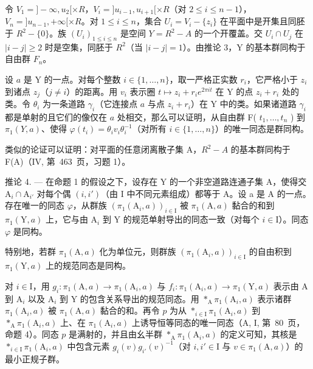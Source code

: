 令 \(V_{1} = ]-\infty, u_{2}[ \times R\)，\(V_{i} = ]u_{i-1}, u_{i+1}[ \times R\)（对 \(2 \leqslant i \leqslant n-1\)），\(V_{n} = ]u_{n-1}, +\infty[ \times R\)。对 \(1 \leqslant i \leqslant n\)，集合 \(U_{i} = V_{i} - \{z_{i}\}\) 在平面中是开集且同胚于 \(R^{2} - \{0\}\)。族 \((U_{i})_{1 \leqslant i \leqslant n}\) 是空间 \(Y = R^{2} - A\) 的一个开覆盖。交 \(U_{i} \cap U_{j}\) 在 \(|i - j| \geqslant 2\) 时是空集，同胚于 \(R^{2}\)（当 \(|i - j| = 1\)）。由推论 3，Y 的基本群同构于自由群 \(F_{n}\)。

设 \(a\) 是 Y 的一点。对每个整数 \(i \in \{1, \ldots, n\}\)，取一严格正实数 \(r_i\)，它严格小于 \(z_i\) 到诸点 \(z_j\)（\(j \neq i\)）的距离。用 \(v_i\) 表示圈 \(t \mapsto z_i + r_i e^{2\pi it}\) 在 Y 的点 \(z_i + r_i\) 处的类。令 \(\theta_i\) 为一条道路 \(\gamma_i\)（它连接点 \(a\) 与点 \(z_i + r_i\)）在 Y 中的类。如果诸道路 \(\gamma_i\) 都是单射的且它们的像仅在 \(a\) 处相交，那么可以证明，从自由群 F( \(t_1, \ldots, t_n\) ) 到 \(\pi_1(Y, a)\)、使得 \(\varphi(t_i) = \theta_i v_i \theta_i^{-1}\)（对所有 \(i \in \{1, \ldots, n\}\)）的唯一同态是群同构。

类似的论证可以证明：对平面的任意闭离散子集 A，\(R^{2}-A\) 的基本群同构于 F(A)（IV, 第~463~页，习题 1）。

推论 4. --- 在命题 1 的假设之下，设存在 Y 的一个非空道路连通子集 A，使得交 \(\mathrm{A}_i \cap \mathrm{A}_{i'}\) 对每个偶 \((i, i')\)（由 I 中不同元素组成）都等于 A。设 a 是 A 的一点。存在唯一的同态 \(\varphi\)，从群族 \((\pi_1(\mathrm{A}_i, a))_{i \in \mathrm{I}}\) 被 \(\pi_1(\mathrm{A}, a)\) 黏合的和到 \(\pi_1(\mathrm{Y}, a)\) 上，它与由 \(\mathrm{A}_i\) 到 Y 的规范单射导出的同态一致（对每个 \(i \in \mathrm{I}\)）。同态 \(\varphi\) 是同构。

特别地，若群 \(\pi_{1}(\mathrm{A},a)\) 化为单位元，则群族 \((\pi_1(\mathrm{A}_i,a))_{i\in \mathrm{I}}\) 的自由积到 \(\pi_1(\mathrm{Y},a)\) 上的规范同态是同构。

对 \(i \in \mathrm{I}\)，用 \(g_i \colon \pi_1(\mathrm{A}, a) \to \pi_1(\mathrm{A}_i, a)\) 与 \(f_i \colon \pi_1(\mathrm{A}_i, a) \to \pi_1(\mathrm{Y}, a)\) 表示由 \(\mathrm{A}\) 到 \(\mathrm{A}_i\) 以及 \(\mathrm{A}_i\) 到 \(\mathrm{Y}\) 的包含关系导出的规范同态。用 \(*_{\mathrm{A}} \pi_1(\mathrm{A}_i, a)\) 表示诸群 \(\pi_1(\mathrm{A}_i, a)\) 被 \(\pi_1(\mathrm{A}, a)\) 黏合的和。再令 \(p\) 为从 \(*_{i \in \mathrm{I}} \pi_1(\mathrm{A}_i, a)\) 到 \(*_{\mathrm{A}} \pi_1(\mathrm{A}_i, a)\) 上、在 \(\pi_1(\mathrm{A}_i, a)\) 上诱导恒等同态的唯一同态（A, I, 第~80~页，命题 4）。同态 \(p\) 是满射的，并且由幺半群 \(*_{\mathrm{A}} \pi_1(\mathrm{A}_i, a)\) 的定义可知，其核是 \(*_{i \in \mathrm{I}} \pi_1(\mathrm{A}_i, a)\) 中包含元素 \(g_i(v)g_{i'}(v)^{-1}\)（对 \(i, i' \in \mathrm{I}\) 与 \(v \in \pi_1(\mathrm{A}, a)\)）的最小正规子群。

